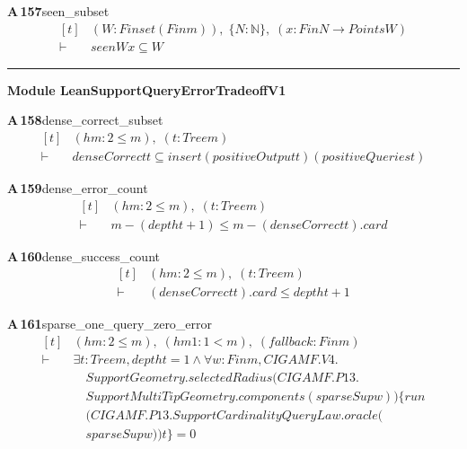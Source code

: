 \documentclass[conference]{IEEEtran}
\theoremstyle{definition}
\newcommand{\lean}[1]{\textsf{\footnotesize #1}}
\begin{document}
\noindent\textbf{A\,157}\quad\lean{seen\_subset}
{\footnotesize\[ \begin{aligned}[t]
&(\mathit{W} : \mathit{Finset} (\mathit{Fin} \mathit{m})),\; \{ \mathit{N} : \mathbb{N} \},\; (\mathit{x} : \mathit{Fin} \mathit{N} \to \mathit{Points} \mathit{W})\\
\vdash\;&\mathit{seen} \mathit{W} \mathit{x} \subseteq \mathit{W}
\end{aligned} \]}

\vspace{4pt}\noindent\rule{\columnwidth}{0.4pt}\par\vspace{2pt}
\noindent\textbf{Module \lean{LeanSupportQueryErrorTradeoffV1}}\par\vspace{3pt}

\noindent\textbf{A\,158}\quad\lean{dense\_correct\_subset}
{\footnotesize\[ \begin{aligned}[t]
&(\mathit{hm} : 2 \leq \mathit{m}),\; (\mathit{t} : \mathit{Tree} \mathit{m})\\
\vdash\;&\mathit{denseCorrect} \mathit{t} \subseteq \mathit{insert} (\mathit{positiveOutput} \mathit{t}) (\mathit{positiveQueries} \mathit{t})
\end{aligned} \]}

\noindent\textbf{A\,159}\quad\lean{dense\_error\_count}
{\footnotesize\[ \begin{aligned}[t]
&(\mathit{hm} : 2 \leq \mathit{m}),\; (\mathit{t} : \mathit{Tree} \mathit{m})\\
\vdash\;&\mathit{m} - (\mathit{depth} \mathit{t} + 1) \leq \mathit{m} - (\mathit{denseCorrect} \mathit{t}).\mathit{card}
\end{aligned} \]}

\noindent\textbf{A\,160}\quad\lean{dense\_success\_count}
{\footnotesize\[ \begin{aligned}[t]
&(\mathit{hm} : 2 \leq \mathit{m}),\; (\mathit{t} : \mathit{Tree} \mathit{m})\\
\vdash\;&(\mathit{denseCorrect} \mathit{t}).\mathit{card} \leq \mathit{depth} \mathit{t} + 1
\end{aligned} \]}

\noindent\textbf{A\,161}\quad\lean{sparse\_one\_query\_zero\_error}
{\footnotesize\[ \begin{aligned}[t]
&(\mathit{hm} : 2 \leq \mathit{m}),\; (\mathit{hm1} : 1 < \mathit{m}),\; (\mathit{fallback} : \mathit{Fin} \mathit{m})\\
\vdash\;&\exists \mathit{t} : \mathit{Tree} \mathit{m}, \mathit{depth} \mathit{t} = 1 \wedge \forall \mathit{w} : \mathit{Fin} \mathit{m}, \mathit{CIGAMF}.\mathit{V4}.\\
&\quad \mathit{SupportGeometry}.\mathit{selectedRadius} (\mathit{CIGAMF}.\mathit{P13}.\\
&\quad \mathit{SupportMultiTipGeometry}.\mathit{components} (\mathit{sparseSup} \mathit{w})) \{ \mathit{run}\\
&\quad (\mathit{CIGAMF}.\mathit{P13}.\mathit{SupportCardinalityQueryLaw}.\mathit{oracle} (\\
&\quad \mathit{sparseSup} \mathit{w})) \mathit{t}\} = 0
\end{aligned} \]}
\end{document}
